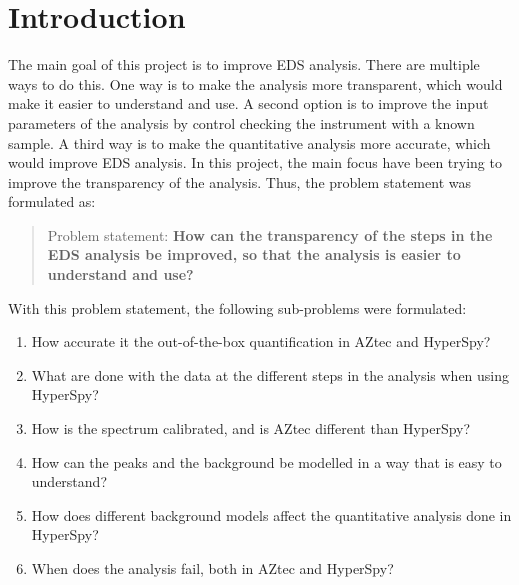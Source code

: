 \chapter{Introduction}
\label{chap:introduction}

%
%
The main goal of this project is to improve EDS analysis. There are multiple ways to do this.
One way is to make the analysis more transparent, which would make it easier to understand and use.
A second option is to improve the input parameters of the analysis by control checking the instrument with a known sample.
A third way is to make the quantitative analysis more accurate, which would improve EDS analysis.
In this project, the main focus have been trying to improve the transparency of the analysis. Thus, the problem statement was formulated as:

\begin{quote}
    Problem statement: \textbf{How can the transparency of the steps in the EDS analysis be improved, so that the analysis is easier to understand and use?
    }
\end{quote}


With this problem statement, the following sub-problems were formulated:


\begin{enumerate}
    \item How accurate it the out-of-the-box quantification in AZtec and HyperSpy?
    \item What are done with the data at the different steps in the analysis when using HyperSpy?
    \item How is the spectrum calibrated, and is AZtec different than HyperSpy?
    \item How can the peaks and the background be modelled in a way that is easy to understand?
    \item How does different background models affect the quantitative analysis done in HyperSpy?
    \item When does the analysis fail, both in AZtec and HyperSpy?
\end{enumerate}


